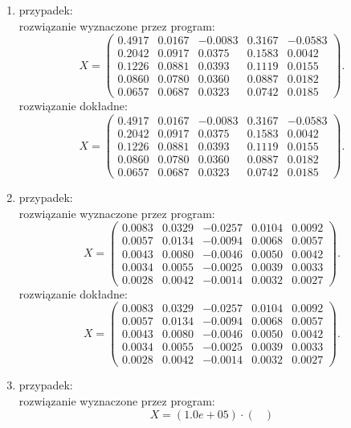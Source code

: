 \documentclass[12pt]{article}
\begin{document}
\begin{enumerate}
\item przypadek:
\\
rozwi\k{a}zanie wyznaczone przez program:
\[
X=\begin{pmatrix}
0.4917 & 0.0167 & -0.0083 & 0.3167 & -0.0583 \\
0.2042 & 0.0917 & 0.0375 & 0.1583 & 0.0042 \\
0.1226 & 0.0881 & 0.0393 & 0.1119 & 0.0155 \\
0.0860 & 0.0780 & 0.0360 & 0.0887 & 0.0182 \\
0.0657 & 0.0687 & 0.0323 & 0.0742 & 0.0185
\end{pmatrix}.
\]
rozwi\k{a}zanie dok\l{}adne:
\[
X=\begin{pmatrix}
0.4917 & 0.0167 & -0.0083 & 0.3167 & -0.0583 \\
0.2042 & 0.0917 & 0.0375 & 0.1583 & 0.0042 \\
0.1226 & 0.0881 & 0.0393 & 0.1119 & 0.0155 \\
0.0860 & 0.0780 & 0.0360 & 0.0887 & 0.0182 \\
0.0657 & 0.0687 & 0.0323 & 0.0742 & 0.0185
\end{pmatrix}.
\]
\item przypadek:
\\
rozwi\k{a}zanie wyznaczone przez program:
\[
X=\begin{pmatrix}
0.0083 & 0.0329 & -0.0257 & 0.0104 & 0.0092 \\
0.0057 & 0.0134 & -0.0094 & 0.0068 & 0.0057 \\
0.0043 & 0.0080 & -0.0046 & 0.0050 & 0.0042 \\
0.0034 & 0.0055 & -0.0025 & 0.0039 & 0.0033 \\
0.0028 & 0.0042 & -0.0014 & 0.0032 & 0.0027
\end{pmatrix}.
\]
rozwi\k{a}zanie dok\l{}adne:
\[
X=\begin{pmatrix}
0.0083 & 0.0329 & -0.0257 & 0.0104 & 0.0092 \\
0.0057 & 0.0134 & -0.0094 & 0.0068 & 0.0057 \\
0.0043 & 0.0080 & -0.0046 & 0.0050 & 0.0042 \\
0.0034 & 0.0055 & -0.0025 & 0.0039 & 0.0033 \\
0.0028 & 0.0042 & -0.0014 & 0.0032 & 0.0027
\end{pmatrix}.
\]
\item przypadek:
\\
rozwi\k{a}zanie wyznaczone przez program:
\\ 
\[ 
X=\left(1.0e+05\right) \cdot \begin{pmatrix}

\end{pmatrix}\]
\end{enumerate}
\end{document}
